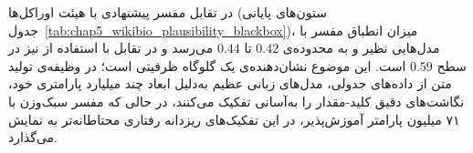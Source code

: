 در تقابل مفسر پیشنهادی با هیئت اوراکل‌ها (ستون‌های پایانی جدول~\ref{tab:chap5_wikibio_plausibility_blackbox})، میزان انطباق مفسر با مدل‌هایی نظیر  و  به محدوده‌ی $0.42$ تا $0.44$ می‌رسد و در تقابل با استفاده از  نیز در سطح $0.59$ است. این موضوع نشان‌دهنده‌ی یک گلوگاه ظرفیتی است؛ در وظیفه‌ی تولید متن از داده‌های جدولی، مدل‌های زبانی عظیم به‌دلیل ابعاد چند میلیارد پارامتری خود، نگاشت‌های دقیق کلید-مقدار را به‌آسانی تفکیک می‌کنند، در حالی که مفسر سبک‌وزن  با ۷۱ میلیون پارامتر آموزش‌پذیر، در این تفکیک‌های ریزدانه رفتاری محتاطانه‌تر به نمایش می‌گذارد.

\vspace{0.25cm}
\begin{table}[ht]
    \centering
    \footnotesize
    \caption{ماتریس‌های درهم‌ریختگی معقولیت انتساب، مجموعه‌داده‌ی  (جعبه‌سیاه)}\label{tab:chap5_wikibio_plausibility_blackbox}
    \linespread{1}\selectfont
    \setlength{\tabcolsep}{7.5pt}
    \renewcommand{\arraystretch}{1.5}
    \setlength{\aboverulesep}{0pt}
    \setlength{\belowrulesep}{0pt}


\end{table}
